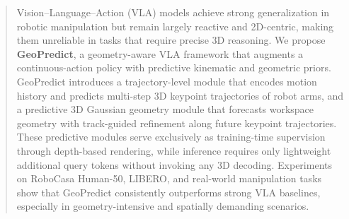 \begin{abstract}
Vision--Language--Action (VLA) models achieve strong generalization in robotic manipulation but remain largely reactive and 2D-centric, making them unreliable in tasks that require precise 3D reasoning. We propose \textbf{GeoPredict}, a geometry-aware VLA framework that augments a continuous-action policy with predictive kinematic and geometric priors. GeoPredict introduces a trajectory-level module that encodes motion history and predicts multi-step 3D keypoint trajectories of robot arms, and a predictive 3D Gaussian geometry module that forecasts workspace geometry with track-guided refinement along future keypoint trajectories. These predictive modules serve exclusively as training-time supervision through depth-based rendering, while inference requires only lightweight additional query tokens without invoking any 3D decoding. Experiments on RoboCasa Human-50, LIBERO, and real-world manipulation tasks show that GeoPredict consistently outperforms strong VLA baselines, especially in geometry-intensive and spatially demanding scenarios.


\end{abstract}